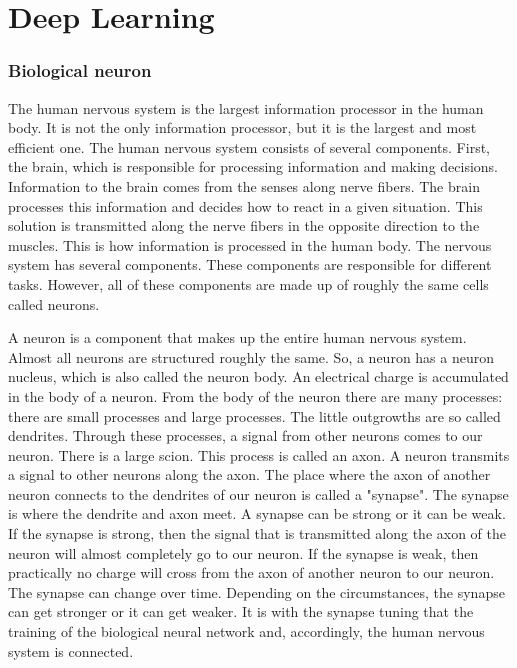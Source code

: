 \chapter{Deep Learning}
\label{ch:deep_learning}

\subsection{Biological neuron}
The human nervous system is the largest information processor in the human body. It is not the only information processor, but it is the largest and most efficient one. The human nervous system consists of several components. First, the brain, which is responsible for processing information and making decisions. Information to the brain comes from the senses along nerve fibers. The brain processes this information and decides how to react in a given situation. This solution is transmitted along the nerve fibers in the opposite direction to the muscles. This is how information is processed in the human body. The nervous system has several components. These components are responsible for different tasks. However, all of these components are made up of roughly the same cells called neurons.

A neuron is a component that makes up the entire human nervous system. Almost all neurons are structured roughly the same. 
So, a neuron has a neuron nucleus, which is also called the neuron body. An electrical charge is accumulated in the body of a neuron. From the body of the neuron there are many processes: there are small processes and large processes. The little outgrowths are so called dendrites. Through these processes, a signal from other neurons comes to our neuron. There is a large scion. This process is called an axon. A neuron transmits a signal to other neurons along the axon. The place where the axon of another neuron connects to the dendrites of our neuron is called a "synapse". The synapse is where the dendrite and axon meet. A synapse can be strong or it can be weak. If the synapse is strong, then the signal that is transmitted along the axon of the neuron will almost completely go to our neuron. If the synapse is weak, then practically no charge will cross from the axon of another neuron to our neuron. The synapse can change over time. Depending on the circumstances, the synapse can get stronger or it can get weaker. It is with the synapse tuning that the training of the biological neural network and, accordingly, the human nervous system is connected.

